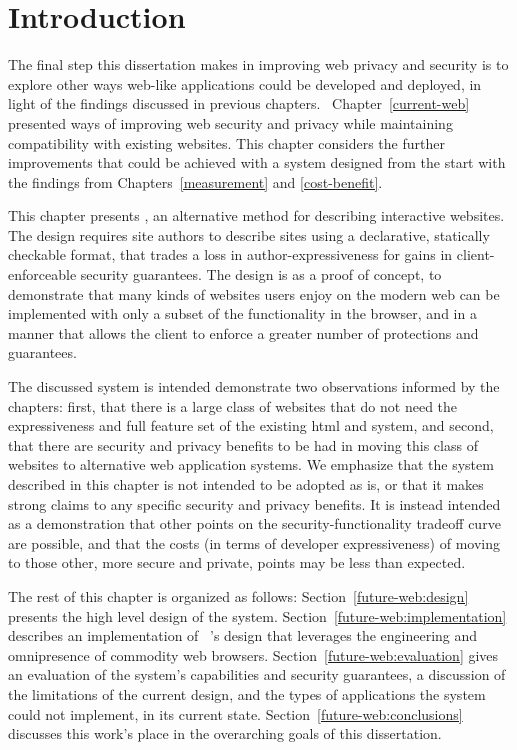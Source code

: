 \section{Introduction}
\label{future-web:introduction}

The final step this dissertation makes in improving web privacy and security is
to explore other ways web-like applications could be developed and deployed, in
light of the findings discussed in previous chapters.
 Chapter~\ref{current-web} presented ways of improving web security and privacy
while maintaining compatibility with existing websites. This chapter considers
the further improvements that could be achieved with a system designed from the
start with the findings from Chapters~\ref{measurement} and \ref{cost-benefit}.

This chapter presents \CDF, an alternative method for describing interactive
websites. The design requires site authors to describe sites using a
declarative, statically checkable format, that trades a loss in
author-expressiveness for gains in client-enforceable security guarantees.  The
design is as a proof of concept, to demonstrate that many kinds of websites
users enjoy on the modern web can be implemented with only a subset of the
functionality in the browser, and in a manner that allows the client to enforce
a greater number of protections and guarantees.

The discussed system is intended demonstrate two observations informed by the
chapters: first, that there is a large class of websites that do not need
the expressiveness and full feature set of the existing \gls{html} and \JS
system, and second, that there are security and privacy benefits to be had
in moving this class of websites to alternative web application systems.
We emphasize that the system described in this chapter is not intended to
be adopted as is, or that it makes strong claims to any specific
security and privacy benefits.  It is instead intended as a demonstration
that other points on the security-functionality tradeoff curve are possible,
and that the costs (in terms of developer expressiveness) of moving to those
other, more secure and private, points may be less than expected.

The rest of this chapter is organized as follows:
Section~\ref{future-web:design} presents the high level design of the system.
Section~\ref{future-web:implementation} describes an implementation of \CDF~'s
design that leverages the engineering and omnipresence of commodity web
browsers.  Section~\ref{future-web:evaluation} gives an evaluation of the
system's capabilities and security guarantees, a discussion of the limitations
of the current design, and the types of applications the system could not
implement, in its current state.  Section~\ref{future-web:conclusions}
discusses this work's place in the overarching goals of this dissertation.
